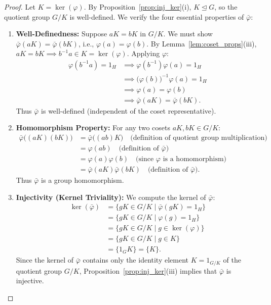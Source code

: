 \begin{proof}
Let $K = \ker(\varphi)$. By Proposition~\ref{prop:inj_ker}(i), $K \trianglelefteq G$, so the quotient group $G/K$ is well-defined.
We verify the four essential properties of $\bar{\varphi}$:
\begin{enumerate}[label=\arabic*., leftmargin=*]
    \item \textbf{Well-Definedness:}
    Suppose $aK = bK$ in $G/K$. We must show $\bar{\varphi}(aK) = \bar{\varphi}(bK)$, i.e., $\varphi(a) = \varphi(b)$.
    By Lemma~\ref{lem:coset_props}(iii), $aK = bK \implies b^{-1}a \in K = \ker(\varphi)$.
    Applying $\varphi$:
    \begin{align*}
    \varphi(b^{-1}a) = 1_H 
    &\implies \varphi(b^{-1})\varphi(a) = 1_H \\
    &\implies \bigl(\varphi(b)\bigr)^{-1}\varphi(a) = 1_H \\
    &\implies \varphi(a) = \varphi(b) \\
    &\implies \bar{\varphi}(aK) = \bar{\varphi}(bK).
    \end{align*}
    Thus $\bar{\varphi}$ is well-defined (independent of the coset representative).

    \item \textbf{Homomorphism Property:}
    For any two cosets $aK, bK \in G/K$:
    \begin{align*}
    \bar{\varphi}\bigl((aK)(bK)\bigr) &= \bar{\varphi}\bigl((ab)K\bigr) \quad \text{(definition of quotient group multiplication)} \\
    &= \varphi(ab) \quad \text{(definition of $\bar{\varphi}$)} \\
    &= \varphi(a)\varphi(b) \quad \text{(since $\varphi$ is a homomorphism)} \\
    &= \bar{\varphi}(aK)\bar{\varphi}(bK) \quad \text{(definition of $\bar{\varphi}$)}.
    \end{align*}
    Thus $\bar{\varphi}$ is a group homomorphism.

    \item \textbf{Injectivity (Kernel Triviality):}
    We compute the kernel of $\bar{\varphi}$:
    \begin{align*}
    \ker(\bar{\varphi}) &= \{ gK \in G/K \mid \bar{\varphi}(gK) = 1_H \} \\
    &= \{ gK \in G/K \mid \varphi(g) = 1_H \} \\
    &= \{ gK \in G/K \mid g \in \ker(\varphi) \} \\
    &= \{ gK \in G/K \mid g \in K \} \\
    &= \{ 1_G K \} = \{ K \}.
    \end{align*}
    Since the kernel of $\bar{\varphi}$ contains only the identity element $K = 1_{G/K}$ of the quotient group $G/K$, Proposition~\ref{prop:inj_ker}(iii) implies that $\bar{\varphi}$ is injective.


\end{enumerate}
\end{proof}

